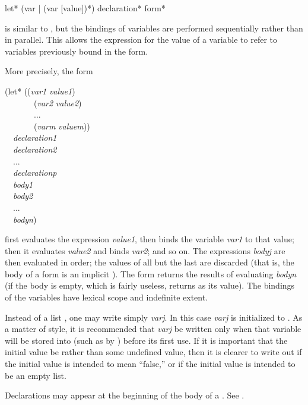 \begin{defspec}
let* ({var | (var [value])}*) {declaration}* {form}*

 is similar to , but the bindings of variables
are performed sequentially rather than in parallel.  This allows
the expression for the value of a variable to refer to variables
previously bound in the  form.

More precisely, the form
\begin{lisp}
(let* ((\emph{var1} \emph{value1}) \\
~~~~~~~(\emph{var2} \emph{value2}) \\
~~~~~~~... \\
~~~~~~~(\emph{varm} \emph{valuem})) \\
~~\emph{declaration1} \\
~~\emph{declaration2} \\
~~... \\
~~\emph{declarationp} \\
~~\emph{body1} \\
~~\emph{body2} \\
~~... \\
~~\emph{bodyn})
\end{lisp}
first evaluates the expression \emph{value1}, then binds the variable
\emph{var1} to that value; then it evaluates \emph{value2} and binds \emph{var2};
and so on.
The expressions \emph{bodyj} are then evaluated
in order; the values of all but the last are discarded
(that is, the body of a  form is an implicit ).
The  form returns the results of evaluating \emph{bodyn} (if the
body is empty, which is fairly useless,  returns {\false} as its value).
The bindings of the variables have lexical scope and indefinite extent.

Instead of a list , one may write simply \emph{varj}.
In this case \emph{varj} is initialized to {\false}.  As a matter of style,
it is recommended that \emph{varj} be written only when that variable
will be stored into (such as by ) before its first use.
If it is important that the initial value be {\nil} rather than
some undefined value, then it is clearer to write out
 if the initial value is intended to mean ``false,'' or
 if the initial value is intended to be an empty
list.

Declarations may appear at the beginning of the body of a .
See .
\end{defspec}

